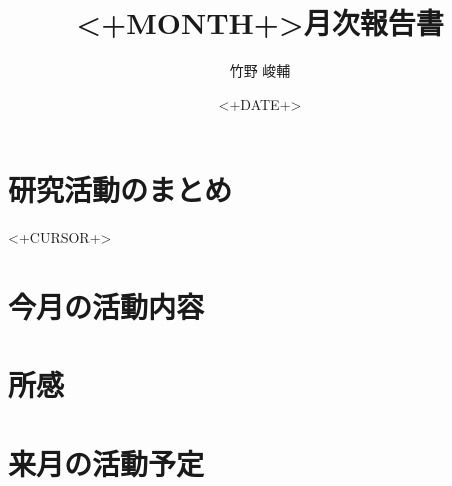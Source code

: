 \documentclass[twocolumn]{jsarticle}
\begin{document}
\title{<+MONTH+>月次報告書} 
\author{竹野 峻輔}
\date{<+DATE+>} 
\maketitle

\section{研究活動のまとめ}

<+CURSOR+>

\section{今月の活動内容}

\section{所感}

\section{来月の活動予定} 
\end{document}
